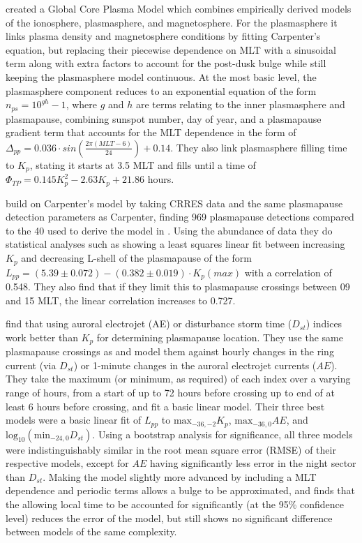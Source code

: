 \cite{Gallagher2000GlobalCore} created a Global Core Plasma Model which combines empirically derived models of the ionosphere, plasmasphere, and magnetosphere. For the plasmasphere it links plasma density and magnetosphere conditions by fitting Carpenter's equation, but replacing their piecewise dependence on MLT with a sinusoidal term along with extra factors to account for the post-dusk bulge while still keeping the plasmasphere model continuous. At the most basic level, the plasmasphere component reduces to an exponential equation of the form $n_{ps}=10^{gh}-1$, where $g$ and $h$ are terms relating to the inner plasmasphere and plasmapause, combining sunspot number, day of year, and a plasmapause gradient term that accounts for the MLT dependence in the form of $\Delta_{pp}=0.036\cdot sin(\frac{2\pi (MLT-6)}{24})+0.14$. They also link plasmasphere filling time to $K_p$, stating it starts at 3.5 MLT and fills until a time of $\Phi_{TP}=0.145K_p^2-2.63K_p+21.86$ hours\cite{Gallagher1995AzimuthalVariation}.

\cite{Moldwin2002ModelPlasmapause} build on Carpenter's model by taking CRRES data and the same plasmapause detection parameters as Carpenter, finding 969 plasmapause detections compared to the 40 used to derive the model in \cite{Carpenter1992ISEEModel}. Using the abundance of data they do statistical analyses such as showing a least squares linear fit between increasing $K_p$ and decreasing L-shell of the plasmapause of the form $L_{pp}=(5.39\pm 0.072)-(0.382\pm 0.019)\cdot K_p(max)$ with a correlation of 0.548. They also find that if they limit this to plasmapause crossings between 09 and 15 MLT, the linear correlation increases to 0.727.

\cite{OBrien2003EmpiricalPlasmapause} find that using auroral electrojet (AE) or disturbance storm time ($D_{st}$) indices work better than $K_p$ for determining plasmapause location. They use the same plasmapause crossings as \cite{Moldwin2002ModelPlasmapause} and model them against hourly changes in the ring current (via $D_{st}$) or 1-minute changes in the auroral electrojet currents ($AE$). They take the maximum (or minimum, as required) of each index over a varying range of hours, from a start of up to 72 hours before crossing up to end of at least 6 hours before crossing, and fit a basic linear model. Their three best models were a basic linear fit of $L_{pp}$ to $\text{max}_{-36,-2}K_p$, $\text{max}_{-36,0}AE$, and $\text{log}_{10}(\text{min}_{-24,0}D_{st})$. Using a bootstrap analysis for significance, all three models were indistinguishably similar in the root mean square error (RMSE) of their respective models, except for $AE$ having significantly less error in the night sector than $D_{st}$. Making the model slightly more advanced by including a MLT dependence and periodic terms allows a bulge to be approximated, and finds that the allowing local time to be accounted for significantly (at the 95\% confidence level) reduces the error of the model, but still shows no significant difference between models of the same complexity.

